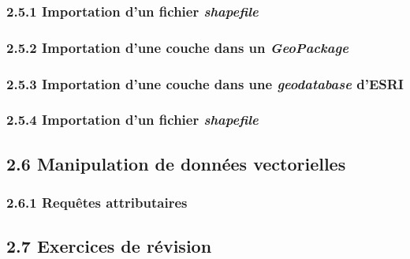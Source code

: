 \subsubsection{\texorpdfstring{{2.5.1} Importation d'un fichier
\emph{shapefile}}{2.5.1 Importation d'un fichier shapefile}}\label{importation-dun-fichier-shapefile}

\subsubsection{\texorpdfstring{{2.5.2} Importation d'une couche dans un
\emph{GeoPackage}}{2.5.2 Importation d'une couche dans un GeoPackage}}\label{importation-dune-couche-dans-un-geopackage}

\subsubsection{\texorpdfstring{{2.5.3} Importation d'une couche dans une
\emph{geodatabase}
d'ESRI}{2.5.3 Importation d'une couche dans une geodatabase d'ESRI}}\label{importation-dune-couche-dans-une-geodatabase-desri}

\subsubsection{\texorpdfstring{{2.5.4} Importation d'un fichier
\emph{shapefile}}{2.5.4 Importation d'un fichier shapefile}}\label{importation-dun-fichier-shapefile-1}

\subsection{\texorpdfstring{{2.6} Manipulation de données
vectorielles}{2.6 Manipulation de données vectorielles}}\label{manipulation-de-donnuxe9es-vectorielles}

\subsubsection{\texorpdfstring{{2.6.1} Requêtes
attributaires}{2.6.1 Requêtes attributaires}}\label{requuxeates-attributaires}

\subsection{\texorpdfstring{{2.7} Exercices de
révision}{2.7 Exercices de révision}}\label{exercices-de-ruxe9vision}


